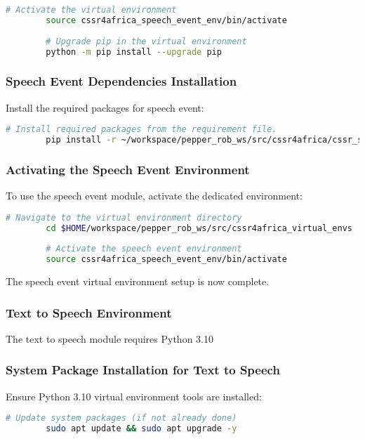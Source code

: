 \documentclass{CSSRforAfrica}
\begin{document}
{\begin{lstlisting}[style=withoutNumbering, language=bash]
		# Activate the virtual environment
		source cssr4africa_speech_event_env/bin/activate
		
		# Upgrade pip in the virtual environment
		python -m pip install --upgrade pip
		\end{lstlisting}
		
		\subsubsection*{Speech Event Dependencies Installation}
		Install the required packages for speech event:
		\begin{lstlisting}[style=withoutNumbering, language=bash]
		# Install required packages from the requirement file.
		pip install -r ~/workspace/pepper_rob_ws/src/cssr4africa/cssr_system/speech_event/speech_event_requirements.txt
		\end{lstlisting}
		
		\subsubsection*{Activating the Speech Event Environment}
		To use the speech event module, activate the dedicated environment:
		\begin{lstlisting}[style=withoutNumbering, language=bash]
		# Navigate to the virtual environment directory
		cd $HOME/workspace/pepper_rob_ws/src/cssr4africa_virtual_envs
		
		# Activate the speech event environment
		source cssr4africa_speech_event_env/bin/activate
		\end{lstlisting} 
		
		\noindent The speech event virtual environment setup is now complete. \\
		
		\subsubsection*{Text to Speech Environment}
		The text to speech module requires Python 3.10
		
		\subsubsection*{System Package Installation for Text to Speech}
		Ensure Python 3.10 virtual environment tools are installed:
		\begin{lstlisting}[style=withoutNumbering, language=bash]
		# Update system packages (if not already done)
		sudo apt update && sudo apt upgrade -y
		

\end{lstlisting}}
\end{document}
